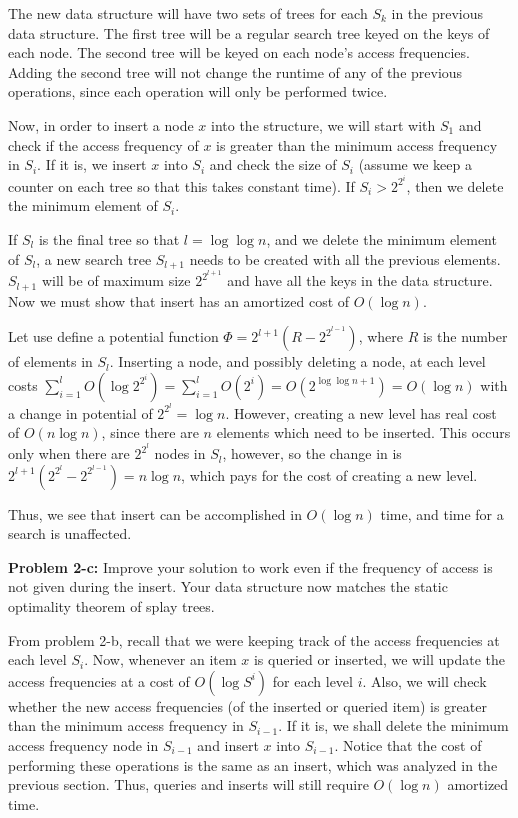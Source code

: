 \documentclass[psamsfonts]{amsart}
\newenvironment{sol}{\vspace{0.25cm}{\large \bfseries Solution:}}{\qedsymbol}
\newenvironment{prob}[1]{\begin{framed}{\large \bfseries Problem #1:}}{\end{framed}}
\begin{document}
\begin{sol}
The new data structure will have two sets of trees for each $S_k$ in the previous data structure. The first tree will be a regular search tree keyed on the keys of each node. The second tree will be keyed on each node's access frequencies. Adding the second tree will not change the runtime of any of the previous operations, since each operation will only be performed twice. 

Now, in order to insert a node $x$ into the structure, we will start with $S_1$ and check if the access frequency of $x$ is greater than the minimum access frequency in $S_i$. If it is, we insert $x$ into $S_i$ and check the size of $S_i$ (assume we keep a counter on each tree so that this takes constant time). If $S_i > 2^{2^i}$, then we delete the minimum element of $S_i$. 

If $S_l$ is the final tree so that $l = \log \log n$, and we delete the minimum element of $S_l$, a new search tree $S_{l+1}$ needs to be created with all the previous elements. $S_{l+1}$ will be of maximum size $2^{2^{l+1}}$ and have all the keys in the data structure. Now we must show that insert has an amortized cost of $O(\log n)$. 

Let use define a potential function $\Phi = 2^{l+1}(R - 2^{2^{l-1}})$, where $R$ is the number of elements in $S_l$. Inserting a node, and possibly deleting a node, at each level costs $\sum_{i=1}^l O(\log 2^{2^{i}}) = \sum_{i=1}^l O(2^i) = O(2^{\log \log n + 1}) = O(\log n)$ with a change in potential of $2^{2^{l}} = \log n$. However, creating a new level has real cost of $O(n \log n)$, since there are $n$ elements which need to be inserted. This occurs only when there are $2^{2^l}$ nodes in $S_l$, however, so the change in is $2^{l+1}(2^{2^l} - 2^{2^{l-1}}) = n \log n$, which pays for the cost of creating a new level.

Thus, we see that insert can be accomplished in $O(\log n)$ time, and time for a search is unaffected.
\end{sol}

\begin{prob}{2-c}
Improve your solution to work even if the frequency of access is not given during the insert. Your data structure now matches the static optimality theorem of splay trees.
\end{prob}

\begin{sol}
From problem 2-b, recall that we were keeping track of the access frequencies at each level $S_i$. Now, whenever an item $x$ is queried or inserted, we will update the access frequencies at a cost of $O(\log S^i)$ for each level $i$. Also, we will check whether the new access frequencies (of the inserted or queried item) is greater than the minimum access frequency in $S_{i-1}$. If it is, we shall delete the minimum access frequency node in $S_{i-1}$ and insert $x$ into $S_{i-1}$. Notice that the cost of performing these operations is the same as an insert, which was analyzed in the previous section. Thus, queries and inserts will still require $O(\log n)$ amortized time. 
\end{sol}
\end{document}
